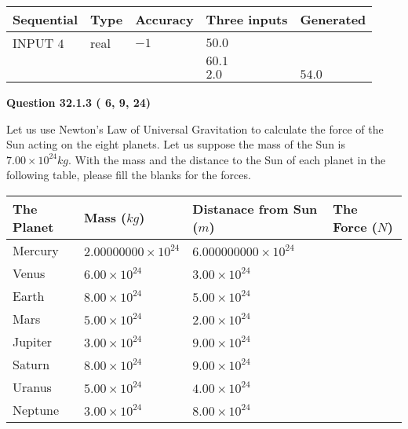 \documentclass[12pt]{article}
\begin{document}
   
  
  
\noindent\begin{tabular}{|l|l|l|l|l|}
\hline
 Sequential & Type & Accuracy & Three inputs & Generated \\ 
\hline
 
 
  INPUT $           4$ & real & $          -1 $ & $
 50.0
  $ & \\
  & & &  $
 60.1
  $ & \\
  & & &  $
 2.0
 $ & $ 54.0 $ 
 \\  \hline  
 \end{tabular}
   
   
  
\vspace{0.2in}
  
{\textbf{\Large{Question
32.1.3 
 (          6,          9,         24)
}}}
  
  
Let us use Newton's Law of Universal Gravitation to calculate the force
of the Sun acting on the eight planets. Let us suppose the mass of the
Sun is $ %
7.00 \times 10^{24} kg$. With the mass and the
distance to the Sun of each planet in the following table, please fill
the blanks for the forces.
 
\vspace{0.2in}
 
 
\begin{tabular}{|l|l|l|l|}
\hline
The Planet & Mass ($kg$) & Distanace from Sun ($m$) & The Force ($N$)\\
\hline
Mercury  &
           $ %
2.00000000 \times 10^{24} $   &
             $ %
6.000000000 \times 10^{24} $    &
\\  \hline
Venus    &
           $ %
6.00 \times 10^{24} $    &
             $ %
3.00 \times 10^{24} $    &
\\  \hline
Earth    &
           $ %
8.00 \times 10^{24} $    &
             $ %
5.00 \times 10^{24} $    &
\\   \hline
Mars     &
           $ %
5.00 \times 10^{24} $    &
             $ %
2.00 \times 10^{24} $    &
\\   \hline
Jupiter  &
           $ %
3.00 \times 10^{24} $    &
             $ %
9.00 \times 10^{24} $    &
\\  \hline
Saturn   &
           $ %
8.00 \times 10^{24}$    &
             $ %
9.00 \times 10^{24}$    &
\\  \hline
Uranus   &
           $ %
5.00 \times 10^{24} $    &
             $ %
4.00 \times 10^{24} $    &
\\  \hline
Neptune  &
           $ %
3.00 \times 10^{24} $    &
             $ %
8.00 \times 10^{24} $    &
\\  \hline
 
\end{tabular}
 
\end{document}
